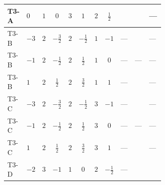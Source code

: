 \documentclass[8pt]{article}
\begin{document}
\begin{landscape}
\begin{longtable}{@{}llcccccc >{\raggedright\arraybackslash}p{0.21\linewidth} >{\raggedright\arraybackslash}p{0.21\linewidth} >{\raggedright\arraybackslash}p{0.21\linewidth}@{}}
\midrule
T3-A & $0$ & $1$ & $0$ & $3$ & $1$ & $2$ & $\frac{1}{2}$ & \scriptsize\adjustbox{max width=\linewidth}{$\begin{gathered} {m_1^2} (4 T_{\nu}^{(1)}+4 {\lambda_{S_1}^{(1)}})\end{gathered}$} & \scriptsize\adjustbox{max width=\linewidth}{$\begin{gathered} -8 \operatorname{Tr}\!\left({M_F}\,\left({M_F}\right)^{\dagger}\,\left({y_1}\right)^{T}\,\left({y_1}\right)^{*}\right)\end{gathered}$} & --- \\
\midrule
T3-B & $-3$ & $2$ & $-\frac{3}{2}$ & $2$ & $-\frac{1}{2}$ & $1$ & $-1$ & --- & \scriptsize\adjustbox{max width=\linewidth}{$\begin{gathered} -4 \operatorname{Tr}\!\left({M_F}\,\left({M_F}\right)^{\dagger}\,\left({y_1}\right)^{T}\,\left({y_1}\right)^{*}\right)\end{gathered}$} & --- \\
\midrule
T3-B & $-1$ & $2$ & $-\frac{1}{2}$ & $2$ & $\frac{1}{2}$ & $1$ & $0$ & --- & --- & --- \\
\midrule
T3-B & $1$ & $2$ & $\frac{1}{2}$ & $2$ & $\frac{3}{2}$ & $1$ & $1$ & --- & \scriptsize\adjustbox{max width=\linewidth}{$\begin{gathered} -4 \operatorname{Tr}\!\left({M_F}\,\left({M_F}\right)^{\dagger}\,\left({y_1}\right)^{T}\,\left({y_1}\right)^{*}\right)\end{gathered}$} & --- \\
\midrule
T3-C & $-3$ & $2$ & $-\frac{3}{2}$ & $2$ & $-\frac{1}{2}$ & $3$ & $-1$ & --- & \scriptsize\adjustbox{max width=\linewidth}{$\begin{gathered} -6 \operatorname{Tr}\!\left({M_F}\,\left({M_F}\right)^{\dagger}\,\left({y_1}\right)^{T}\,\left({y_1}\right)^{*}\right)\end{gathered}$} & --- \\
\midrule
T3-C & $-1$ & $2$ & $-\frac{1}{2}$ & $2$ & $\frac{1}{2}$ & $3$ & $0$ & --- & --- & --- \\
\midrule
T3-C & $1$ & $2$ & $\frac{1}{2}$ & $2$ & $\frac{3}{2}$ & $3$ & $1$ & --- & \scriptsize\adjustbox{max width=\linewidth}{$\begin{gathered} -6 \operatorname{Tr}\!\left({M_F}\,\left({M_F}\right)^{\dagger}\,\left({y_1}\right)^{T}\,\left({y_1}\right)^{*}\right)\end{gathered}$} & --- \\
\midrule
T3-D & $-2$ & $3$ & $-1$ & $1$ & $0$ & $2$ & $-\frac{1}{2}$ & --- & \scriptsize\adjustbox{max width=\linewidth}{$\begin{gathered} -4 \operatorname{Tr}\!\left({M_F}\,\left({M_F}\right)^{\dagger}\,\left({y_1}\right)^{T}\,\left({y_1}\right)^{*}\right)\end{gathered}$} & \scriptsize\adjustbox{max width=\linewidth}{$\begin{gathered} -6 {g_1}^2 {m_1^2}\end{gathered}$} \\

\end{longtable}
\end{landscape}
\end{document}
